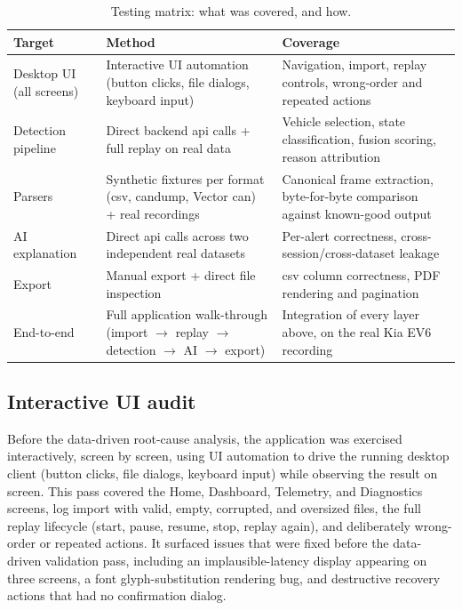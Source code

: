 \begin{table}[H]
\centering
\caption{Testing matrix: what was covered, and how.}
\label{tab:testing-matrix}
\begin{tabularx}{\textwidth}{|l|X|X|}
\hline
\textbf{Target} & \textbf{Method} & \textbf{Coverage} \\
\hline
Desktop UI (all screens) & Interactive UI automation (button clicks, file dialogs, keyboard input) & Navigation, import, replay controls, wrong-order and repeated actions \\
\hline
Detection pipeline & Direct backend \gls{api} calls + full replay on real data & Vehicle selection, state classification, fusion scoring, reason attribution \\
\hline
Parsers & Synthetic fixtures per format (\gls{csv}, candump, Vector \gls{can}) + real recordings & Canonical frame extraction, byte-for-byte comparison against known-good output \\
\hline
AI explanation & Direct \gls{api} calls across two independent real datasets & Per-alert correctness, cross-session/cross-dataset leakage \\
\hline
Export & Manual export + direct file inspection & \gls{csv} column correctness, PDF rendering and pagination \\
\hline
End-to-end & Full application walk-through (import $\to$ replay $\to$ detection $\to$ AI $\to$ export) & Integration of every layer above, on the real Kia EV6 recording \\
\hline
\end{tabularx}
\end{table}

\subsection{Interactive UI audit}

Before the data-driven root-cause analysis, the application was exercised interactively, screen by screen, using UI automation to drive the running desktop client (button clicks, file dialogs, keyboard input) while observing the result on screen. This pass covered the Home, Dashboard, Telemetry, and Diagnostics screens, log import with valid, empty, corrupted, and oversized files, the full replay lifecycle (start, pause, resume, stop, replay again), and deliberately wrong-order or repeated actions. It surfaced issues that were fixed before the data-driven validation pass, including an implausible-latency display appearing on three screens, a font glyph-substitution rendering bug, and destructive recovery actions that had no confirmation dialog.

